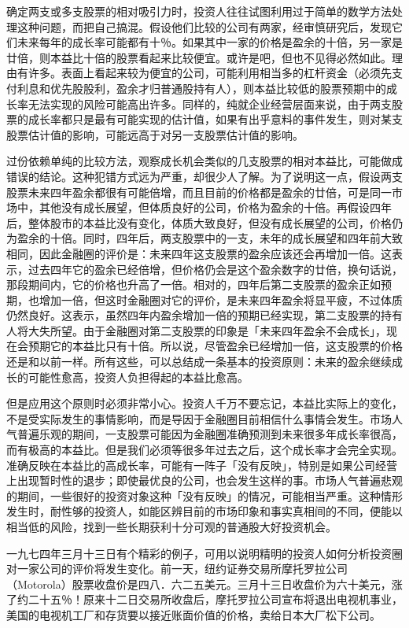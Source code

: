 \documentclass[UTF8,a4paper,zihao=-4,fontset = windows]{ctexart} %
\begin{document}
确定两支或多支股票的相对吸引力时，投资人往往试图利用过于简单的数学方法处理这种问题，而把自己搞混。假设他们比较的公司有两家，经审慎研究后，发现它们未来每年的成长率可能都有十％。如果其中一家的价格是盈余的十倍，另一家是廿倍，则本益比十倍的股票看起来比较便宜。或许是吧，但也不见得必然如此。理由有许多。表面上看起来较为便宜的公司，可能利用相当多的杠杆资金（必须先支付利息和优先股股利，盈余才归普通股持有人），则本益比较低的股票预期中的成长率无法实现的风险可能高出许多。同样的，纯就企业经营层面来说，由于两支股票的成长率都只是最有可能实现的估计值，如果有出乎意料的事件发生，则对某支股票估计值的影响，可能远高于对另一支股票估计值的影响。

过份依赖单纯的比较方法，观察成长机会类似的几支股票的相对本益比，可能做成错误的结论。这种犯错方式远为严重，却很少人了解。为了说明这一点，假设两支股票未来四年盈余都很有可能倍增，而且目前的价格都是盈余的廿倍，可是同一市场中，其他没有成长展望，但体质良好的公司，价格为盈余的十倍。再假设四年后，整体股市的本益比没有变化，体质大致良好，但没有成长展望的公司，价格仍为盈余的十倍。同时，四年后，两支股票中的一支，未年的成长展望和四年前大致相同，因此金融圈的评价是：未来四年这支股票的盈余应该还会再增加一倍。这表示，过去四年它的盈余已经倍增，但价格仍会是这个盈余数字的廿倍，换句话说，那段期间内，它的价格也升高了一倍。相对的，四年后第二支股票的盈余正如预期，也增加一倍，但这时金融圈对它的评价，是未来四年盈余将显平疲，不过体质仍然良好。这表示，虽然四年内盈余增加一倍的预期已经实现，第二支股票的持有人将大失所望。由于金融圈对第二支股票的印象是「未来四年盈余不会成长」，现在会预期它的本益比只有十倍。所以说，尽管盈余已经增加一倍，这支股票的价格还是和以前一样。所有这些，可以总结成一条基本的投资原则：未来的盈余继续成长的可能性愈高，投资人负担得起的本益比愈高。

但是应用这个原则时必须非常小心。投资人千万不要忘记，本益比实际上的变化，不是受实际发生的事情影响，而是导因于金融圈目前相信什么事情会发生。市场人气普遍乐观的期间，一支股票可能因为金融圈准确预测到未来很多年成长率很高，而有极高的本益比。但是我们必须等很多年过去之后，这个成长率才会完全实现。准确反映在本益比的高成长率，可能有一阵子「没有反映」，特别是如果公司经营上出现暂时性的退步；即使最优良的公司，也会发生这样的事。市场人气普遍悲观的期间，一些很好的投资对象这种「没有反映」的情况，可能相当严重。这种情形发生时，耐性够的投资人，如能区辨目前的市场印象和事实真相间的不同，便能以相当低的风险，找到一些长期获利十分可观的普通股大好投资机会。

一九七四年三月十三日有个精彩的例子，可用以说明精明的投资人如何分析投资圈对一家公司的评价将发生变化。前一天，纽约证券交易所摩托罗拉公司（Motorola）股票收盘价是四八．六二五美元。三月十三日收盘价为六十美元，涨了约二十五％！原来十二日交易所收盘后，摩托罗拉公司宣布将退出电视机事业，美国的电视机工厂和存货要以接近账面价值的价格，卖给日本大厂松下公司。
\end{document}
